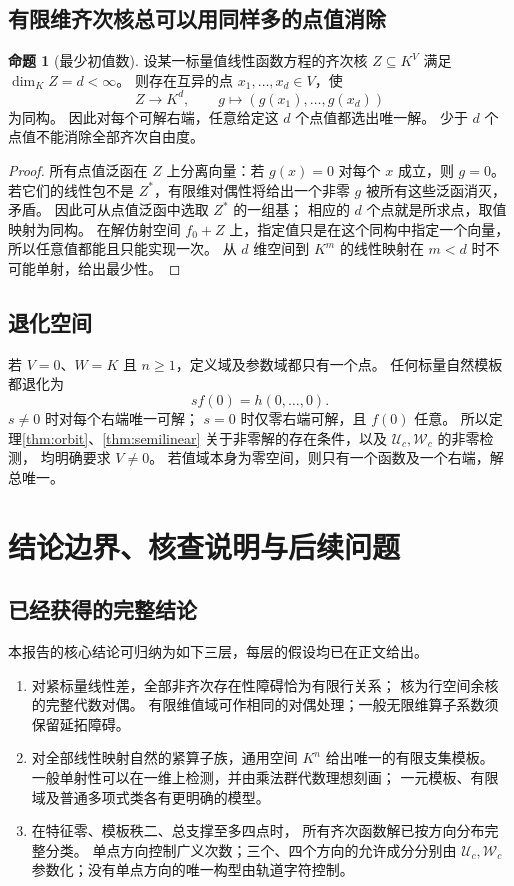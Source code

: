 \documentclass[UTF8,11pt,a4paper]{ctexart}
\theoremstyle{definition}
\newtheorem{proposition}[theorem]{命题}
\newcommand{\Uc}{\mathscr U_c}
\newcommand{\Wc}{\mathscr W_c}
\numberwithin{equation}{section}
\begin{document}
\subsection{有限维齐次核总可以用同样多的点值消除}
\begin{proposition}[最少初值数]\label{prop:initialvalues}
设某一标量值线性函数方程的齐次核 $Z\subseteq K^V$
满足 $\dim_KZ=d<\infty$。
则存在互异的点 $x_1,\ldots,x_d\in V$，使
\[
 Z\longrightarrow K^d,\qquad
 g\longmapsto(g(x_1),\ldots,g(x_d))
\]
为同构。
因此对每个可解右端，任意给定这 $d$ 个点值都选出唯一解。
少于 $d$ 个点值不能消除全部齐次自由度。
\end{proposition}
\begin{proof}
所有点值泛函在 $Z$ 上分离向量：若 $g(x)=0$ 对每个 $x$ 成立，则 $g=0$。
若它们的线性包不是 $Z^*$，有限维对偶性将给出一个非零 $g$
被所有这些泛函消灭，矛盾。
因此可从点值泛函中选取 $Z^*$ 的一组基；
相应的 $d$ 个点就是所求点，取值映射为同构。
在解仿射空间 $f_0+Z$ 上，指定值只是在这个同构中指定一个向量，
所以任意值都能且只能实现一次。
从 $d$ 维空间到 $K^m$ 的线性映射在 $m<d$ 时不可能单射，给出最少性。
\end{proof}

\subsection{退化空间}
若 $V=0$、$W=K$ 且 $n\ge1$，定义域及参数域都只有一个点。
任何标量自然模板都退化为
\[
 s f(0)=h(0,\ldots,0).
\]
$s\ne0$ 时对每个右端唯一可解；
$s=0$ 时仅零右端可解，且 $f(0)$ 任意。
所以定理\ref{thm:orbit}、\ref{thm:semilinear}
关于非零解的存在条件，以及 $\Uc,\Wc$ 的非零检测，
均明确要求 $V\ne0$。
若值域本身为零空间，则只有一个函数及一个右端，解总唯一。

\section{结论边界、核查说明与后续问题}\label{sec:scope}
\subsection{已经获得的完整结论}
本报告的核心结论可归纳为如下三层，每层的假设均已在正文给出。
\begin{enumerate}
\item 对紧标量线性差，全部非齐次存在性障碍恰为有限行关系；
核为行空间余核的完整代数对偶。
有限维值域可作相同的对偶处理；一般无限维算子系数须保留延拓障碍。
\item 对全部线性映射自然的紧算子族，通用空间 $K^n$
给出唯一的有限支集模板。
一般单射性可以在一维上检测，并由乘法群代数理想刻画；
一元模板、有限域及普通多项式类各有更明确的模型。
\item 在特征零、模板秩二、总支撑至多四点时，
所有齐次函数解已按方向分布完整分类。
单点方向控制广义次数；三个、四个方向的允许成分分别由
$\Uc,\Wc$ 参数化；没有单点方向的唯一构型由轨道字符控制。
\end{enumerate}
\end{document}
